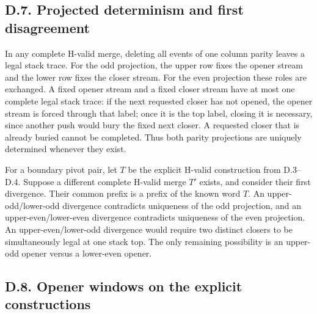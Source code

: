 \documentclass[11pt]{article}
\theoremstyle{definition}
\theoremstyle{remark}
\begin{document}
\subsection{D.7. Projected determinism and first
disagreement}\label{d.7.-projected-determinism-and-first-disagreement}

In any complete H-valid merge, deleting all events of one column parity
leaves a legal stack trace. For the odd projection, the upper row fixes
the opener stream and the lower row fixes the closer stream. For the
even projection these roles are exchanged. A fixed opener stream and a
fixed closer stream have at most one complete legal stack trace:
if the next requested closer has not opened, the opener stream is forced
through that label; once it is the top label, closing it is necessary,
since another push would bury the fixed next closer. A requested closer
that is already buried cannot be completed. Thus both parity projections
are uniquely determined whenever they exist.

For a boundary pivot pair, let $T$ be the explicit H-valid construction
from D.3--D.4. Suppose a different complete H-valid merge $T'$ exists,
and consider their first divergence. Their common prefix is a prefix
of the known word $T$. An upper-odd/lower-odd divergence contradicts
uniqueness of the odd projection, and an upper-even/lower-even divergence
contradicts uniqueness of the even projection. An upper-even/lower-odd
divergence would require two distinct closers to be simultaneously legal
at one stack top. The only remaining possibility is an upper-odd opener
versus a lower-even opener.

\subsection{D.8. Opener windows on the explicit
constructions}\label{d.8.-corrected-cross-parity-windows}
\end{document}
